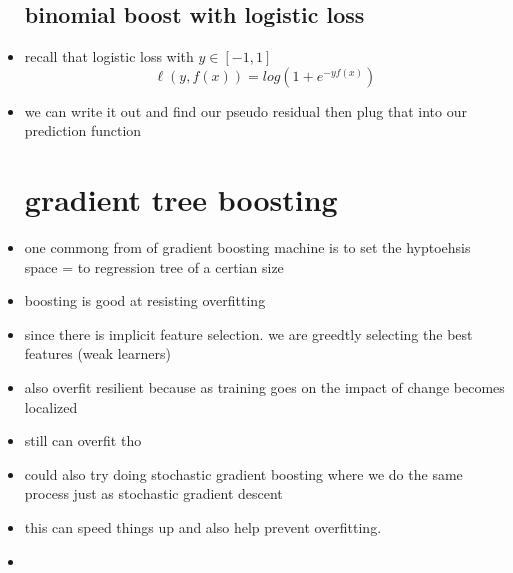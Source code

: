\documentclass{article}
\begin{document}
\begin{itemize}
\subsection*{binomial boost with logistic loss}
\item recall that logistic loss with $y\in [-1,1]$ 
 $$\ell(y,f(x))=log(1+e^{-yf(x)})$$
\item we can write it out and find our pseudo residual then plug that into our prediction function
\section*{gradient tree boosting}
\item one commong from of gradient boosting machine is to set the hyptoehsis space = to regression tree of a certian size
\item  boosting is good at resisting overfitting 
\item since there is implicit feature selection. we are greedtly selecting the best features (weak learners)
\item also overfit resilient because as training goes on the impact of change becomes localized 
\item still can overfit tho 
\item could also try doing stochastic gradient boosting where we do the same process just as stochastic gradient descent 
\item this can speed things up and also help prevent overfitting.
\item 
\end{itemize}
\end{document}
